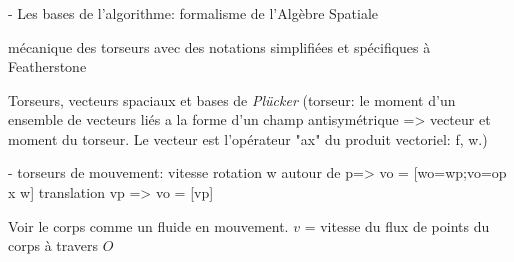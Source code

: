 \documentclass[10pt]{beamer}
\begin{document}
\begin{frame}
  \frametitle{}

- Les bases de l'algorithme: formalisme de l'Algèbre Spatiale

  mécanique des torseurs avec des notations simplifiées et spécifiques à Featherstone

  Torseurs, vecteurs spaciaux et bases de \emph{Plücker}
    (torseur: le moment d'un ensemble de vecteurs liés a la forme d'un champ antisymétrique => vecteur et moment du torseur.
    Le vecteur est l'opérateur "ax" du produit vectoriel: f, w.)
    
    - torseurs de mouvement: vitesse
    rotation w autour de p=> vo =  [wo=wp;vo=op x w]
    translation vp        => vo =  [vp]
    
    Voir le corps comme un fluide en mouvement. $v$ = vitesse du flux de points du corps à travers $O$
%    
%    
%    
%    
%    
%    

\end{frame}
\end{document}
